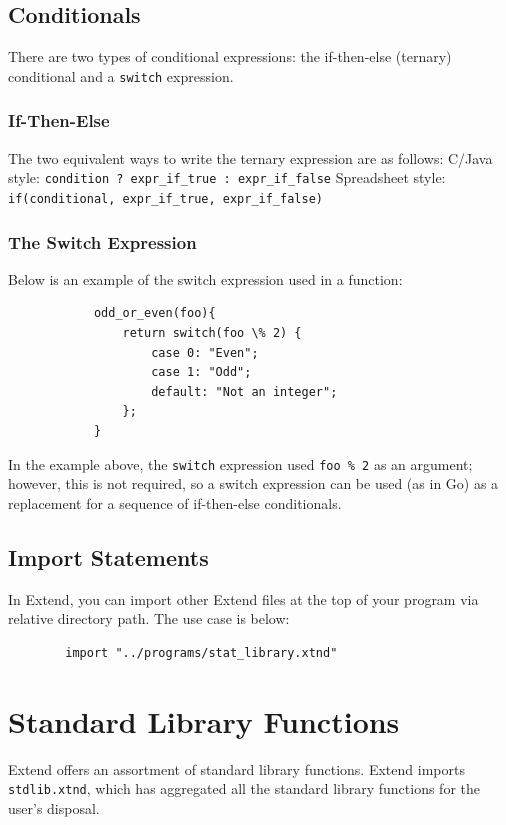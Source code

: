 	\subsection{Conditionals}
	There are two types of conditional expressions: the if-then-else (ternary) conditional and a \texttt{switch} expression.

		\subsubsection{If-Then-Else}
		The two equivalent ways to write the ternary expression are as follows: \newline \newline
		C/Java style: \texttt{condition ? expr\_if\_true : expr\_if\_false} \newline \newline
		Spreadsheet style: \texttt{if(conditional, expr\_if\_true, expr\_if\_false)}

		\subsubsection{The Switch Expression}
		Below is an example of the switch expression used in a function:

		\begin{lstlisting}
			odd_or_even(foo){
				return switch(foo \% 2) {
					case 0: "Even";
					case 1: "Odd";
					default: "Not an integer";
				};
			}
		\end{lstlisting}

	\medskip \noindent
	In the example above, the \texttt{switch} expression used \texttt{foo \% 2} as an argument; however, this is not required, so a switch expression can be used (as in Go) as a replacement for a sequence of if-then-else conditionals.

	\subsection{Import Statements}
	In Extend, you can import other Extend files at the top of your program via relative directory path. The use case is below:

	\begin{lstlisting}
		import "../programs/stat_library.xtnd"
	\end{lstlisting}


\section{Standard Library Functions}
Extend offers an assortment of standard library functions. Extend imports \texttt{stdlib.xtnd}, which has aggregated all the standard library functions for the user's disposal.

